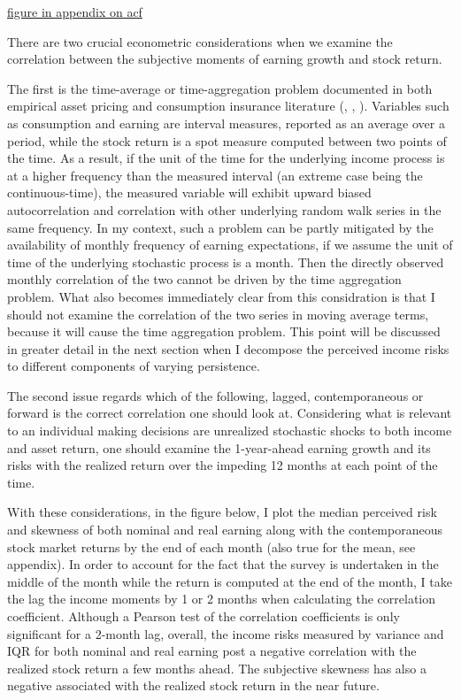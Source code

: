 \documentclass[12pt,notitlepage,onecolumn,aps,pra]{revtex4-1}
\begin{document}
\href{appendix/acfpot.jpg}{figure in appendix on acf}

There are two crucial econometric considerations when we examine the
correlation between the subjective moments of earning growth and stock
return.

The first is the time-average or time-aggregation problem documented in
both empirical asset pricing and consumption insurance literature
(\cite{working_note_1960}, \cite{jagannathan_lazy_2007},
\cite{crawley_search_2019}). Variables such as consumption and earning
are interval measures, reported as an average over a period, while the
stock return is a spot measure computed between two points of the time.
As a result, if the unit of the time for the underlying income process
is at a higher frequency than the measured interval (an extreme case
being the continuous-time), the measured variable will exhibit upward
biased autocorrelation and correlation with other underlying random walk
series in the same frequency. In my context, such a problem can be
partly mitigated by the availability of monthly frequency of earning
expectations, if we assume the unit of time of the underlying stochastic
process is a month. Then the directly observed monthly correlation of
the two cannot be driven by the time aggregation problem. What also
becomes immediately clear from this considration is that I should not
examine the correlation of the two series in moving average terms,
because it will cause the time aggregation problem. This point will be
discussed in greater detail in the next section when I decompose the
perceived income risks to different components of varying persistence.

The second issue regards which of the following, lagged, contemporaneous
or forward is the correct correlation one should look at. Considering
what is relevant to an individual making decisions are unrealized
stochastic shocks to both income and asset return, one should examine
the 1-year-ahead earning growth and its risks with the realized return
over the impeding 12 months at each point of the time.

With these considerations, in the figure below, I plot the median
perceived risk and skewness of both nominal and real earning along with
the contemporaneous stock market returns by the end of each month (also
true for the mean, see appendix). In order to account for the fact that
the survey is undertaken in the middle of the month while the return is
computed at the end of the month, I take the lag the income moments by 1
or 2 months when calculating the correlation coefficient. Although a
Pearson test of the correlation coefficients is only significant for a
2-month lag, overall, the income risks measured by variance and IQR for
both nominal and real earning post a negative correlation with the
realized stock return a few months ahead. The subjective skewness has
also a negative associated with the realized stock return in the near
future.
\end{document}
